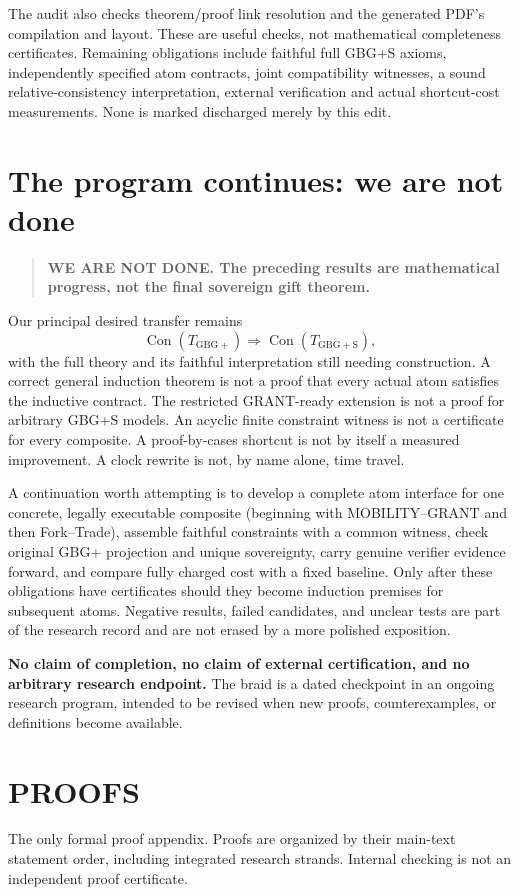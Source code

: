 \documentclass[11pt,letterpaper]{article}
\theoremstyle{definition}\newtheorem{definition}[theorem]{Definition}\newtheorem{example}[theorem]{Example}
\theoremstyle{remark}\newtheorem{remark}[theorem]{Remark}
\newcommand{\Con}{\operatorname{Con}}
\begin{document}
The audit also checks theorem/proof link resolution and the generated PDF's
compilation and layout. These are useful checks, not mathematical completeness
certificates. Remaining obligations include faithful full GBG+S axioms,
independently specified atom contracts, joint compatibility witnesses, a
sound relative-consistency interpretation, external verification and actual
shortcut-cost measurements. None is marked discharged merely by this edit.

\section{The program continues: we are not done}\label{br:sec:not-done}
\begin{quote}\large\bfseries
WE ARE NOT DONE. The preceding results are mathematical progress, not the final sovereign gift theorem.\end{quote}
Our principal desired transfer remains
\[
 \Con(T_{\mathrm{GBG+}})\Longrightarrow\Con(T_{\mathrm{GBG+S}}),
\]
with the full theory and its faithful interpretation still needing construction. A correct general induction theorem is not a proof that every actual atom satisfies the inductive contract. The restricted GRANT-ready extension is not a proof for arbitrary GBG+S models. An acyclic finite constraint witness is not a certificate for every composite. A proof-by-cases shortcut is not by itself a measured improvement. A clock rewrite is not, by name alone, time travel.

A continuation worth attempting is to develop a complete atom interface for one concrete, legally executable composite (beginning with MOBILITY--GRANT and then Fork--Trade), assemble faithful constraints with a common witness, check original GBG+ projection and unique sovereignty, carry genuine verifier evidence forward, and compare fully charged cost with a fixed baseline. Only after these obligations have certificates should they become induction premises for subsequent atoms. Negative results, failed candidates, and unclear tests are part of the research record and are not erased by a more polished exposition.

\textbf{No claim of completion, no claim of external certification, and no arbitrary research endpoint.} The braid is a dated checkpoint in an ongoing research program, intended to be revised when new proofs, counterexamples, or definitions become available.


\appendix
\section{PROOFS}
\label{sec:all-proofs}\label{w0:sec:proofs}
The only formal proof appendix. Proofs are organized by their main-text statement order, including integrated research strands. Internal checking is not an independent proof certificate.
\end{document}
